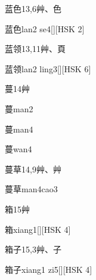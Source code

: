 \begin{Entry}{蓝色}{13,6}{⾋、⾊}
  \begin{Phonetics}{蓝色}{lan2 se4}[][HSK 2]
  \end{Phonetics}
\end{Entry}

\begin{Entry}{蓝领}{13,11}{⾋、⾴}
  \begin{Phonetics}{蓝领}{lan2 ling3}[][HSK 6]
  \end{Phonetics}
\end{Entry}

\begin{Entry}{蔓}{14}{⾋}
  \begin{Phonetics}{蔓}{man2}
  \end{Phonetics}
  \begin{Phonetics}{蔓}{man4}
  \end{Phonetics}
  \begin{Phonetics}{蔓}{wan4}
  \end{Phonetics}
\end{Entry}

\begin{Entry}{蔓草}{14,9}{⾋、⾋}
  \begin{Phonetics}{蔓草}{man4cao3}
  \end{Phonetics}
\end{Entry}

\begin{Entry}{箱}{15}{⾋}
  \begin{Phonetics}{箱}{xiang1}[][HSK 4]
  \end{Phonetics}
\end{Entry}

\begin{Entry}{箱子}{15,3}{⾋、⼦}
  \begin{Phonetics}{箱子}{xiang1 zi5}[][HSK 4]
  \end{Phonetics}
\end{Entry}

